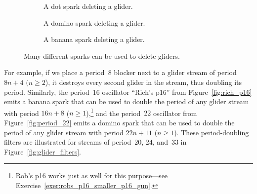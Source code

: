 \begin{figure}[!htb]
	\centering
	\begin{subfigure}{.32\textwidth}
		\centering
		\caption{A dot spark deleting a glider.}
		\label{fig:glider_delete_dot}
	\end{subfigure} \hfill %
	\begin{subfigure}{.32\textwidth}
		\centering
		\caption{A domino spark deleting a glider.}
		\label{fig:glider_delete_domino}
	\end{subfigure} \hfill %
	\begin{subfigure}{.32\textwidth}
		\centering
		\caption{A banana spark deleting a glider.}
		\label{fig:glider_delete_banana}
	\end{subfigure}
	\caption{Many different sparks can be used to delete gliders.}\label{fig:glider_delete_spark}
\end{figure}

For example, if we place a period~$8$ blocker next to a glider stream of period $8n+4$ $(n \geq 2$), it destroys every second glider in the stream, thus doubling its period. Similarly, the period~$16$ oscillator ``Rich's p16'' from Figure~\ref{fig:rich_p16} emits a banana spark that can be used to double the period of any glider stream with period $16n+8$ ($n \geq 1$),\footnote{Rob's p16 works just as well for this purpose---see Exercise~\ref{exer:robs_p16_smaller_p16_gun}.} and the period~$22$ oscillator from Figure~\ref{fig:period_22} emits a domino spark that can be used to double the period of any glider stream with period $22n+11$ ($n \geq 1$). These period-doubling filters are illustrated for streams of period~$20$, $24$, and~$33$ in Figure~\ref{fig:glider_filters}.

